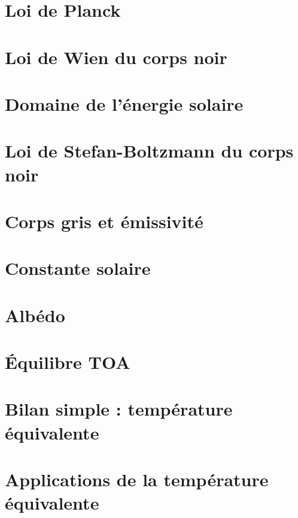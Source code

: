 \documentclass[a4paper,DIV16,10pt]{scrartcl}
\begin{document}
\newpage
\section{Loi de Planck}


\newpage
\section{Loi de Wien du corps noir}


\newpage
\section{Domaine de l'énergie solaire}


\newpage
\section{Loi de Stefan-Boltzmann du corps noir}


\newpage
\section{Corps gris et émissivité}


\newpage
\section{Constante solaire}



\newpage 
\section{Albédo} 


\newpage
\section{\'Equilibre TOA}


\newpage
\section{Bilan simple : température équivalente}


\newpage
\section{Applications de la température équivalente}

\end{document}
